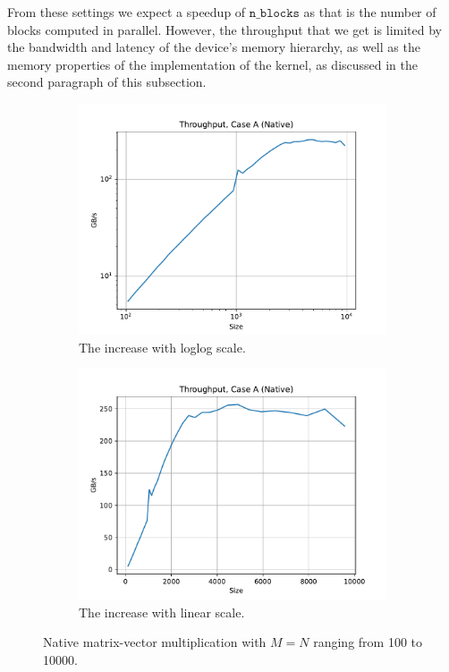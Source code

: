 \documentclass[9pt]{article}
\begin{document}
From these settings we expect a speedup of $\texttt{n\_blocks}$ as that is the number of blocks computed in parallel. However, the throughput that we get is limited by the bandwidth and latency of the device's memory hierarchy, as well as the memory properties of the implementation of the kernel, as discussed in the second paragraph of this subsection.
\begin{figure}[!ht]
    \centering
    \begin{subfigure}[b]{0.49\textwidth}
        \centering
        \includegraphics[width=\linewidth]{figs/case_a_native_loglog.pdf}
        \caption{The increase with loglog scale.}
        \label{fig:native_loglog}
    \end{subfigure}\hfill
    \begin{subfigure}[b]{0.49\textwidth}
        \centering
        \includegraphics[width=\linewidth]{figs/case_a_native_linear.pdf}
	\caption{The increase with linear scale.}
	\label{fig:native_linear}
    \end{subfigure}\hfill
    \caption{Native matrix-vector multiplication with $M=N$ ranging from 100 to 10000.}
    \label{fig:case_a_native_mv_mult}
\end{figure}
\end{document}
